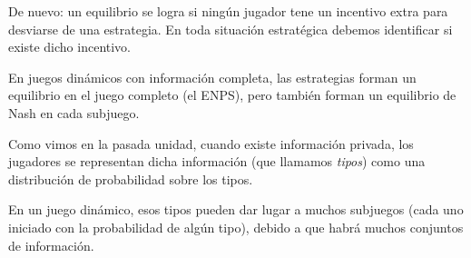 \documentclass[12pt]{article}
\begin{document}
De nuevo: un equilibrio se logra si ningún jugador tene un incentivo extra para desviarse de una estrategia. En toda situación estratégica debemos identificar si existe dicho incentivo.

En juegos dinámicos con información completa, las estrategias forman un equilibrio en el juego completo (el ENPS), pero también forman un equilibrio de Nash en cada subjuego.


Como vimos en la pasada unidad, cuando existe información privada, los jugadores se representan dicha información (que llamamos \textit{tipos}) como una distribución de probabilidad sobre los tipos.

En un juego dinámico, esos tipos pueden dar lugar a muchos subjuegos (cada uno iniciado con la probabilidad de algún tipo), debido a que habrá muchos conjuntos de información.









\end{document}
